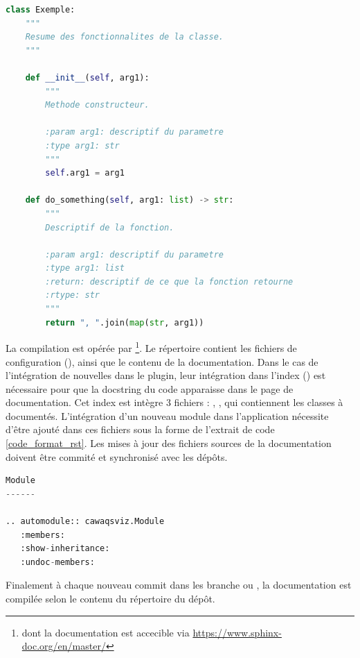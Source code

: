 \begin{lstlisting}[language=Python, caption={Formatage de la docstring pour intégration automatique dans la documentation du code}, label={code_format_docstrings}]
class Exemple:
    """
    Resume des fonctionnalites de la classe.
    """

    def __init__(self, arg1):
        """
        Methode constructeur.

        :param arg1: descriptif du parametre
        :type arg1: str
        """
        self.arg1 = arg1

    def do_something(self, arg1: list) -> str:
        """
        Descriptif de la fonction.

        :param arg1: descriptif du parametre
        :type arg1: list
        :return: descriptif de ce que la fonction retourne
        :rtype: str
        """
        return ", ".join(map(str, arg1))
\end{lstlisting}
\vspace{1em}
La compilation est opérée par \footnote{dont la documentation est accecible via \href{https://www.sphinx-doc.org/en/master/}{https://www.sphinx-doc.org/en/master/}}. Le répertoire  contient les fichiers de configuration (), ainsi que le contenu de la documentation. 
Dans le cas de l'intégration de nouvelles dans le plugin, leur intégration dans l'index () est nécessaire pour que la docstring du code apparaisse dans le page de documentation. Cet index est intègre 3 fichiers  : , ,  qui contiennent les classes à documentés. L'intégration d'un nouveau module dans l'application nécessite d'être ajouté dans ces fichiers sous la forme de l'extrait de code \ref{code_format_rst}. Les mises à jour des fichiers sources de la documentation doivent être commité et synchronisé avec les dépôts. 

\begin{lstlisting}[language=Python,caption={Formatage de la docstring pour intégration automatique dans la documentation du code}, label={code_format_rst}]
Module
------

.. automodule:: cawaqsviz.Module
   :members:
   :show-inheritance:
   :undoc-members:
\end{lstlisting}

\vspace{1em}

Finalement à chaque nouveau commit dans les branche  ou 
, la documentation est compilée selon le contenu du répertoire  du dépôt.

